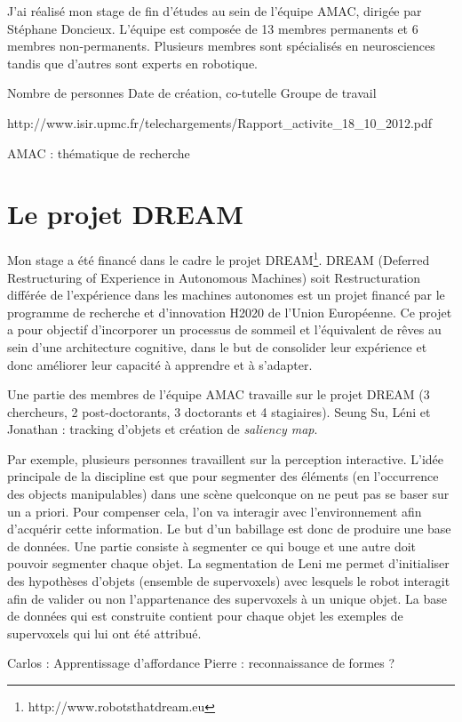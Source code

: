 \documentclass{llncs}
\begin{document}
J'ai réalisé mon stage de fin d'études au sein de l'équipe AMAC, dirigée par Stéphane Doncieux. L'équipe est composée de 13 membres permanents et 6 membres non-permanents. Plusieurs membres sont spécialisés en neurosciences tandis que d'autres sont experts en robotique.


Nombre de personnes
Date de création, co-tutelle
Groupe de travail

http://www.isir.upmc.fr/telechargements/Rapport_activite_18_10_2012.pdf

AMAC : thématique de recherche


\section{Le projet DREAM}
Mon stage a été financé dans le cadre le projet DREAM\footnote{http://www.robotsthatdream.eu}. DREAM (Deferred Restructuring of Experience in Autonomous Machines) soit Restructuration différée de l'expérience dans les machines autonomes est un projet financé par le programme de recherche et d'innovation H2020 de l'Union Européenne. Ce projet a pour objectif d'incorporer un processus de sommeil et l'équivalent de rêves au sein d'une architecture cognitive, dans le but de consolider leur expérience et donc améliorer leur capacité à apprendre et à s'adapter.

Une partie des membres de l'équipe AMAC travaille sur le projet DREAM (3 chercheurs, 2 post-doctorants, 3 doctorants et 4 stagiaires).
Seung Su, Léni et Jonathan : tracking d'objets et création de \textit{saliency map}.

Par exemple, plusieurs personnes travaillent sur la perception interactive. L'idée principale de la discipline est que pour segmenter des éléments (en l'occurrence des objects manipulables) dans une scène quelconque on ne peut pas se baser sur un a priori. Pour compenser cela, l'on va interagir avec l'environnement afin d'acquérir cette information. Le but d'un babillage est donc de produire une base de données. Une partie consiste à segmenter ce qui bouge et une autre doit pouvoir segmenter chaque objet. La segmentation de Leni me permet d'initialiser des hypothèses d'objets (ensemble de supervoxels) avec lesquels le robot interagit afin de valider ou non l'appartenance des supervoxels à un unique objet. La base de données qui est construite contient pour chaque objet les exemples de supervoxels qui lui ont été attribué.

Carlos : Apprentissage d'affordance
Pierre : reconnaissance de formes ?
\end{document}
